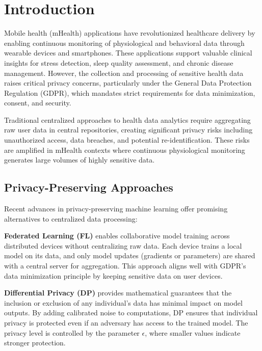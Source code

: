 \documentclass[conference]{IEEEtran}
\begin{document}
\section{Introduction}
\label{sec:introduction}

Mobile health (mHealth) applications have revolutionized healthcare delivery by enabling continuous monitoring of physiological and behavioral data through wearable devices and smartphones. These applications support valuable clinical insights for stress detection, sleep quality assessment, and chronic disease management. However, the collection and processing of sensitive health data raises critical privacy concerns, particularly under the General Data Protection Regulation (GDPR), which mandates strict requirements for data minimization, consent, and security.

Traditional centralized approaches to health data analytics require aggregating raw user data in central repositories, creating significant privacy risks including unauthorized access, data breaches, and potential re-identification. These risks are amplified in mHealth contexts where continuous physiological monitoring generates large volumes of highly sensitive data.

\subsection{Privacy-Preserving Approaches}

Recent advances in privacy-preserving machine learning offer promising alternatives to centralized data processing:

\textbf{Federated Learning (FL)} \cite{mcmahan2017communication} enables collaborative model training across distributed devices without centralizing raw data. Each device trains a local model on its data, and only model updates (gradients or parameters) are shared with a central server for aggregation. This approach aligns well with GDPR's data minimization principle by keeping sensitive data on user devices.

\textbf{Differential Privacy (DP)} \cite{dwork2014algorithmic} provides mathematical guarantees that the inclusion or exclusion of any individual's data has minimal impact on model outputs. By adding calibrated noise to computations, DP ensures that individual privacy is protected even if an adversary has access to the trained model. The privacy level is controlled by the parameter $\epsilon$, where smaller values indicate stronger protection.
\end{document}
